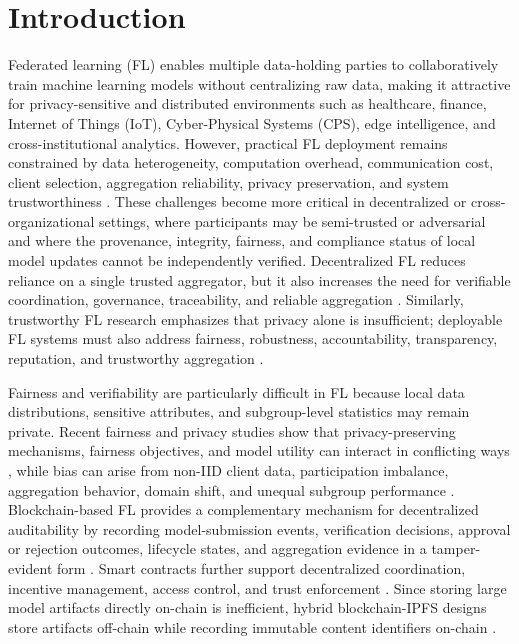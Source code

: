 \documentclass[futureinternet,article,submit,pdftex,moreauthors]{Definitions/mdpi}
\begin{document}
\section{Introduction}
\label{sec:introduction}

Federated learning (FL) enables multiple data-holding parties to collaboratively train machine learning models without centralizing raw data, making it attractive for privacy-sensitive and distributed environments such as healthcare, finance, Internet of Things (IoT), Cyber-Physical Systems (CPS), edge intelligence, and cross-institutional analytics. However, practical FL deployment remains constrained by data heterogeneity, computation overhead, communication cost, client selection, aggregation reliability, privacy preservation, and system trustworthiness \cite{intro_1}. These challenges become more critical in decentralized or cross-organizational settings, where participants may be semi-trusted or adversarial and where the provenance, integrity, fairness, and compliance status of local model updates cannot be independently verified. Decentralized FL reduces reliance on a single trusted aggregator, but it also increases the need for verifiable coordination, governance, traceability, and reliable aggregation \cite{intro_2}. Similarly, trustworthy FL research emphasizes that privacy alone is insufficient; deployable FL systems must also address fairness, robustness, accountability, transparency, reputation, and trustworthy aggregation \cite{intro_3}.

Fairness and verifiability are particularly difficult in FL because local data distributions, sensitive attributes, and subgroup-level statistics may remain private. Recent fairness and privacy studies show that privacy-preserving mechanisms, fairness objectives, and model utility can interact in conflicting ways \cite{intro_4}, while bias can arise from non-IID client data, participation imbalance, aggregation behavior, domain shift, and unequal subgroup performance \cite{intro_5}. Blockchain-based FL provides a complementary mechanism for decentralized auditability by recording model-submission events, verification decisions, approval or rejection outcomes, lifecycle states, and aggregation evidence in a tamper-evident form \cite{intro_6}. Smart contracts further support decentralized coordination, incentive management, access control, and trust enforcement \cite{intro_7}. Since storing large model artifacts directly on-chain is inefficient, hybrid blockchain-IPFS designs store artifacts off-chain while recording immutable content identifiers on-chain \cite{intro_8}.
\end{document}
